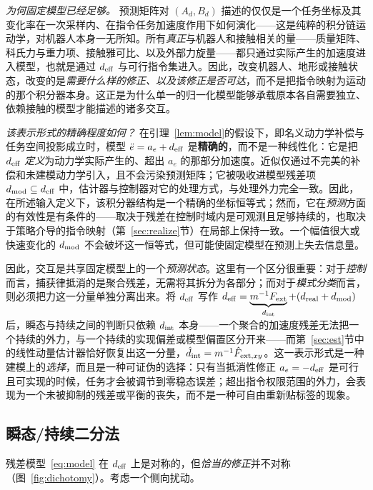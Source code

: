 \documentclass[journal]{IEEEtran}
\begin{document}
\emph{为何固定模型已经足够。} 预测矩阵对 $(A_d,B_d)$ 描述的仅仅是一个任务坐标及其变化率在一次采样内、在指令任务加速度作用下如何演化——这是纯粹的积分链运动学，对机器人本身一无所知。所有\emph{真正}与机器人和接触相关的量——质量矩阵、科氏力与重力项、接触雅可比、以及外部力旋量——都只通过实际产生的加速度进入模型，也就是通过 $d_{\rm eff}$ 与可行指令集进入。因此，改变机器人、地形或接触状态，改变的是\emph{需要什么样的修正、以及该修正是否可达}，而不是把指令映射为运动的那个积分器本身。这正是为什么单一的归一化模型能够承载原本各自需要独立、依赖接触的模型才能描述的诸多交互。

\emph{该表示形式的精确程度如何？} 在引理~\ref{lem:model}的假设下，即名义动力学补偿与任务空间投影成立时，模型 $\ddot e = a_e + d_{\rm eff}$ 是\textbf{精确的}，而不是一种线性化：它是把 $d_{\rm eff}$ \emph{定义}为动力学实际产生的、超出 $a_e$ 的那部分加速度。近似仅通过不完美的补偿和未建模动力学引入，且不会污染预测矩阵；它被吸收进模型残差项 $d_{\rm mod}\subseteq d_{\rm eff}$ 中，估计器与控制器对它的处理方式，与处理外力完全一致。因此，在所述输入定义下，该积分器结构是一个精确的坐标恒等式；然而，它在\emph{预测}方面的有效性是有条件的——取决于残差在控制时域内是可观测且足够持续的，也取决于策略介导的指令映射（第~\ref{sec:realize}节）在局部上保持一致。一个幅值很大或快速变化的 $d_{\rm mod}$ 不会破坏这一恒等式，但可能使固定模型在预测上失去信息量。

因此，交互是共享固定模型上的一个\emph{预测状态}。这里有一个区分很重要：对于\emph{控制}而言，捕获律抵消的是聚合残差，无需将其拆分为各部分；而对于\emph{模式分类}而言，则必须把力这一分量单独分离出来。将 $d_{\rm eff}$ 写作 $d_{\rm eff}=\underbrace{m^{-1}F_{\rm ext}}_{d_{\rm int}}+(d_{\rm real}+d_{\rm mod})$ 后，瞬态与持续之间的判断只依赖 $d_{\rm int}$ 本身——一个聚合的加速度残差无法把一个持续的外力，与一个持续的实现偏差或模型偏置区分开来——而第~\ref{sec:est}节中的线性动量估计器恰好恢复出这一分量，$\hat d_{\rm int}=m^{-1}\hat F_{{\rm ext},xy}$。这一表示形式是一种建模上的\emph{选择}，而且是一种可证伪的选择：只有当抵消性修正 $a_e=-d_{\rm eff}$ 是可行且可实现的时候，任务才会被调节到零稳态误差；超出指令权限范围的外力，会表现为一个未被抑制的残差或平衡的丧失，而不是一种可自由重新贴标签的现象。

\subsection{瞬态/持续二分法}
\label{sec:dichotomy}

残差模型~\eqref{eq:model} 在 $d_{\rm eff}$ 上是对称的，但\emph{恰当的修正}并不对称（图~\ref{fig:dichotomy}）。考虑一个侧向扰动。
\end{document}
